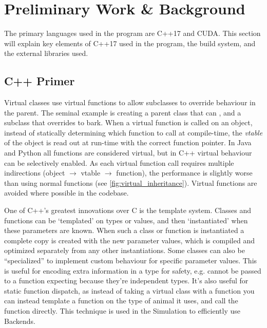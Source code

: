 \section{Preliminary Work \& Background}
The primary languages used in the program are C++17 and CUDA.
This section will explain key elements of C++17 used in the program, the build system, and the external libraries used.

\subsection{C++ Primer}
Virtual classes use virtual functions to allow subclasses to override behaviour in the parent.
The seminal example is creating a parent class  that can , and a subclass  that overrides  to bark.
When a virtual function is called on an object, instead of statically determining which function to call at compile-time, the \emph{vtable} of the object is read out at run-time with the correct function pointer\cite{presentation:RuntimePolymorphism}.
In Java and Python all functions are considered virtual, but in C++ virtual behaviour can be selectively enabled.
As each virtual function call requires multiple indirections (object $\rightarrow$ vtable $\rightarrow$ function), the performance is slightly worse than using normal functions (see \cref{fig:virtual_inheritance}).
Virtual functions are avoided where possible in the codebase.



One of C++'s greatest innovations over C is the template system.
Classes and functions can be `templated' on types or values, and then `instantiated' when these parameters are known.
When such a class or function is instantiated a complete copy is created with the new parameter values, which is compiled and optimized separately from any other instantiations.
Some classes can also be ``specialized'' to implement custom behaviour for specific parameter values.
This is useful for encoding extra information in a type for safety, e.g.  cannot be passed to a function expecting  because they're independent types.
It's also useful for static function dispatch, as instead of taking a virtual class with a  function you can instead template a function on the type of animal it uses, and call the function directly.
This technique is used in the Simulation to efficiently use Backends.

